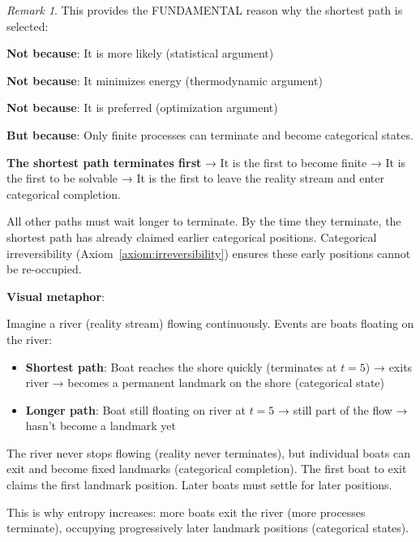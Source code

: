 \documentclass[12pt,a4paper]{article}
\theoremstyle{remark}
\newtheorem{remark}[theorem]{Remark}
\begin{document}
\begin{remark}

This provides the FUNDAMENTAL reason why the shortest path is selected:

\textbf{Not because}: It is more likely (statistical argument)

\textbf{Not because}: It minimizes energy (thermodynamic argument)

\textbf{Not because}: It is preferred (optimization argument)

\textbf{But because}: Only finite processes can terminate and become categorical states.

\textbf{The shortest path terminates first} → It is the first to become finite → It is the first to be solvable → It is the first to leave the reality stream and enter categorical completion.

All other paths must wait longer to terminate. By the time they terminate, the shortest path has already claimed earlier categorical positions. Categorical irreversibility (Axiom~\ref{axiom:irreversibility}) ensures these early positions cannot be re-occupied.

\textbf{Visual metaphor}:

Imagine a river (reality stream) flowing continuously. Events are boats floating on the river:

\begin{itemize}
  \item \textbf{Shortest path}: Boat reaches the shore quickly (terminates at $t=5$) → exits river → becomes a permanent landmark on the shore (categorical state)

  \item \textbf{Longer path}: Boat still floating on river at $t=5$ → still part of the flow → hasn't become a landmark yet
\end{itemize}

The river never stops flowing (reality never terminates), but individual boats can exit and become fixed landmarks (categorical completion). The first boat to exit claims the first landmark position. Later boats must settle for later positions.

This is why entropy increases: more boats exit the river (more processes terminate), occupying progressively later landmark positions (categorical states).

\end{remark}
\end{document}
